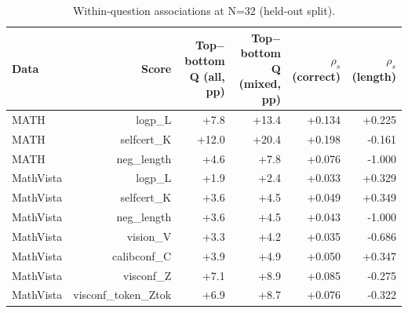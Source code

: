 \begin{table}[t]
\centering
\scriptsize
\begin{tabular}{lrrrrr}
\toprule
Data & Score & Top$-$bottom Q (all, pp) & Top$-$bottom Q (mixed, pp) & $\rho_s$(correct) & $\rho_s$(length) \\
\midrule
MATH & logp\_L & +7.8 & +13.4 & +0.134 & +0.225 \\
MATH & selfcert\_K & +12.0 & +20.4 & +0.198 & -0.161 \\
MATH & neg\_length & +4.6 & +7.8 & +0.076 & -1.000 \\
MathVista & logp\_L & +1.9 & +2.4 & +0.033 & +0.329 \\
MathVista & selfcert\_K & +3.6 & +4.5 & +0.049 & +0.349 \\
MathVista & neg\_length & +3.6 & +4.5 & +0.043 & -1.000 \\
MathVista & vision\_V & +3.3 & +4.2 & +0.035 & -0.686 \\
MathVista & calibconf\_C & +3.9 & +4.9 & +0.050 & +0.347 \\
MathVista & visconf\_Z & +7.1 & +8.9 & +0.085 & -0.275 \\
MathVista & visconf\_token\_Ztok & +6.9 & +8.7 & +0.076 & -0.322 \\
\bottomrule
\end{tabular}
\caption{Within-question associations at N=32 (held-out split).}
\label{tab:t3-signals}
\end{table}
